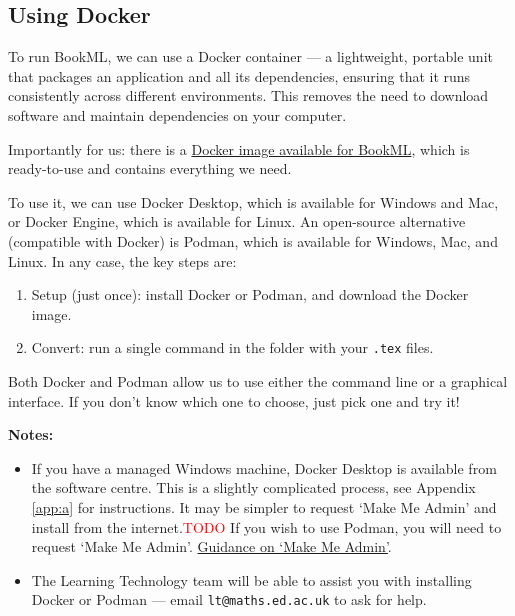 \subsection{Using Docker}
\label{ssec:docker}

To run BookML, we can use a Docker container --- a lightweight, portable unit that packages an application and all its dependencies, ensuring that it runs consistently across different environments. This removes the need to download software and maintain dependencies on your computer.

Importantly for us: there is a \href{https://github.com/vlmantova/bookml/pkgs/container/bookml}{Docker image available for BookML}, which is ready-to-use and contains everything we need.

To use it, we can use Docker Desktop, which is available for Windows and Mac, or Docker Engine, which is available for Linux. An open-source alternative (compatible with Docker) is Podman, which is available for Windows, Mac, and Linux. In any case, the key steps are:

\begin{enumerate}
    \item Setup (just once): install Docker or Podman, and download the Docker image.
    \item Convert: run a single command in the folder with your \verb|.tex| files.
\end{enumerate}

Both Docker and Podman allow us to use either the command line or a graphical interface. If you don't know which one to choose, just pick one and try it!

\noindent \textbf{Notes: }
\begin{itemize}
    \item If you have a managed Windows machine, Docker Desktop is available from the software centre. This is a slightly complicated process, 
    see Appendix \ref{app:a} for instructions. It may be simpler to request `Make Me Admin' and install from the internet.\textcolor{red}{TODO}
    If you wish to use Podman, you will need to request `Make Me Admin'.
    \href{https://www.ed.ac.uk/information-services/computing/desktop-personal/supported/windows-10/makemeadmin}{Guidance on `Make Me Admin'}.
    \item The Learning Technology team will be able to assist you with installing Docker or Podman --- email \verb|lt@maths.ed.ac.uk| to ask for help.
\end{itemize}

